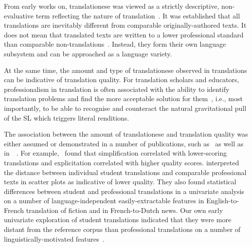 From early works on, translationese was viewed as a strictly descriptive, non-evaluative term reflecting the nature of translation~\cite{Gellerstam1986, Baker1993}. It was established that all translations are inevitably different from comparable originally-authored texts. It does not mean that translated texts are written to a lower professional standard than comparable non-translations~\cite{Sutter2017}. Instead, they form their own language subsystem and can be approached as a language variety.

At the same time, the amount and type of translationese observed in translations can be indicative of translation quality. For translation scholars and educators, professionalism in translation is often associated with the ability to identify translation problems and find the more acceptable solution for them~\cite{Pym2003}, i.e., most importantly, to be able to recognise and counteract the natural gravitational pull of the \gls{SL} which triggers literal renditions.

The association between the amount of translationese and translation quality was either assumed or demonstrated in a number of publications, such as~\citet{Scarpa2006, Rabadan2009, Sutter2017} as well as in~\citet{Loock2013, Loock2016}~\cite[as quoted by][]{Sutter2017}. For example,~\citet{Scarpa2006} found that simplification correlated with lower-scoring translations and explicitation correlated with higher quality scores. \citet{Sutter2017} interpreted the distance between individual student translations and comparable professional texts in scatter plots as indicative of lower quality. They also found statistical differences between student and professional translations in a univariate analysis on a number of language-independent easily-extractable features in English-to-French translation of fiction and in French-to-Dutch news. Our own early univariate exploration of student translations indicated that they were more distant from the reference corpus than professional translations on a number of linguistically-motivated features~\cite{Kunilovskaya2018profiles}.

